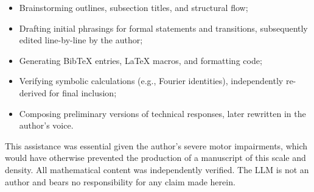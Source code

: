 \begin{itemize}
  \item Brainstorming outlines, subsection titles, and structural flow;
  \item Drafting initial phrasings for formal statements and transitions, subsequently edited line-by-line by the author;
  \item Generating BibTeX entries, \LaTeX{} macros, and formatting code;
  \item Verifying symbolic calculations (e.g., Fourier identities), independently re-derived for final inclusion;
  \item Composing preliminary versions of technical responses, later rewritten in the author’s voice.
\end{itemize}

This assistance was essential given the author’s severe motor impairments, which would have otherwise prevented the production of a manuscript of this scale and density. All mathematical content was independently verified. The LLM is not an author and bears no responsibility for any claim made herein.

